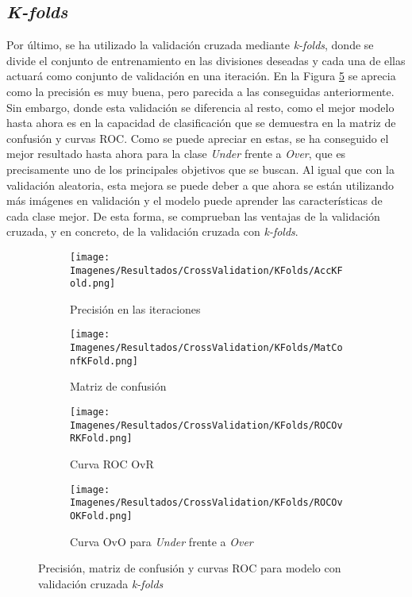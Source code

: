 \documentclass{report}
\begin{document}
\subsection{\textit{K-folds}}

Por último, se ha utilizado la validación cruzada mediante \textit{k-folds}, donde se divide el conjunto de entrenamiento en las divisiones deseadas y cada una de ellas actuará como conjunto de validación en una iteración. En la Figura \ref{fig:CVKFolds} se aprecia como la precisión es muy buena, pero parecida a las conseguidas anteriormente. Sin embargo, donde esta validación se diferencia al resto, como el mejor modelo hasta ahora es en la capacidad de clasificación que se demuestra en la matriz de confusión y curvas ROC. Como se puede apreciar en estas, se ha conseguido el mejor resultado hasta ahora para la clase \textit{Under} frente a \textit{Over}, que es precisamente uno de los principales objetivos que se buscan. Al igual que con la validación aleatoria, esta mejora se puede deber a que ahora se están utilizando más imágenes en validación y el modelo puede aprender las características de cada clase mejor. De esta forma, se comprueban las ventajas de la validación cruzada, y en concreto, de la validación cruzada con \textit{k-folds}.

\vspace{0.4cm}
\begin{figure}[H]
	 	\centering
            \begin{subfigure}[b]{0.45\linewidth}
	 	\centering
	 		\texttt{[image: Imagenes/Resultados/CrossValidation/KFolds/AccKFold.png]}
	 		\caption{ Precisión en las iteraciones }
                    \label{fig:CVKFoldsAcc}
	 	\end{subfigure}
	 	\begin{subfigure}[b]{0.45\linewidth}
	 	\centering
	 		\texttt{[image: Imagenes/Resultados/CrossValidation/KFolds/MatConfKFold.png]}
	 		\caption{ Matriz de confusión }
                    \label{fig:CVKFoldsMatConf}
	 	\end{subfigure}
	 	\begin{subfigure}[b]{0.45\linewidth}
	 	\centering
	 		\texttt{[image: Imagenes/Resultados/CrossValidation/KFolds/ROCOvRKFold.png]}
                    \caption{ Curva ROC OvR}
                    \label{fig:CVKFoldsROCOvR}
	 	\end{subfigure}
            \begin{subfigure}[b]{0.45\linewidth}
	 	\centering
	 		\texttt{[image: Imagenes/Resultados/CrossValidation/KFolds/ROCOvOKFold.png]}
                    \caption{ Curva OvO para \textit{Under} frente a \textit{Over} }
                    \label{fig:CVKFoldsROCOvO}
	 	\end{subfigure}
	 	\caption{ Precisión, matriz de confusión y curvas ROC para modelo con validación cruzada \textit{k-folds} }
	 	\label{fig:CVKFolds}
\end{figure}
\end{document}
